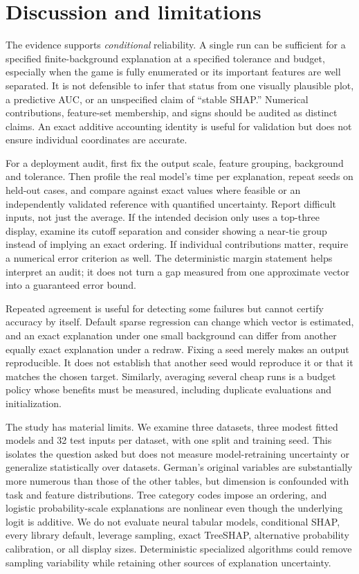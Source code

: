 \section{Discussion and limitations}
\label{sec:discussion}
The evidence supports \emph{conditional} reliability. A single run can be sufficient for a specified finite-background explanation at a specified tolerance and budget, especially when the game is fully enumerated or its important features are well separated. It is not defensible to infer that status from one visually plausible plot, a predictive AUC, or an unspecified claim of ``stable SHAP.'' Numerical contributions, feature-set membership, and signs should be audited as distinct claims. An exact additive accounting identity is useful for validation but does not ensure individual coordinates are accurate.

For a deployment audit, first fix the output scale, feature grouping, background and tolerance. Then profile the real model's time per explanation, repeat seeds on held-out cases, and compare against exact values where feasible or an independently validated reference with quantified uncertainty. Report difficult inputs, not just the average. If the intended decision only uses a top-three display, examine its cutoff separation and consider showing a near-tie group instead of implying an exact ordering. If individual contributions matter, require a numerical error criterion as well. The deterministic margin statement helps interpret an audit; it does not turn a gap measured from one approximate vector into a guaranteed error bound.

Repeated agreement is useful for detecting some failures but cannot certify accuracy by itself. Default sparse regression can change which vector is estimated, and an exact explanation under one small background can differ from another equally exact explanation under a redraw. Fixing a seed merely makes an output reproducible. It does not establish that another seed would reproduce it or that it matches the chosen target. Similarly, averaging several cheap runs is a budget policy whose benefits must be measured, including duplicate evaluations and initialization.

The study has material limits. We examine three datasets, three modest fitted models and 32 test inputs per dataset, with one split and training seed. This isolates the question asked but does not measure model-retraining uncertainty or generalize statistically over datasets. German's original variables are substantially more numerous than those of the other tables, but dimension is confounded with task and feature distributions. Tree category codes impose an ordering, and logistic probability-scale explanations are nonlinear even though the underlying logit is additive. We do not evaluate neural tabular models, conditional SHAP, every library default, leverage sampling, exact TreeSHAP, alternative probability calibration, or all display sizes. Deterministic specialized algorithms could remove sampling variability while retaining other sources of explanation uncertainty.

